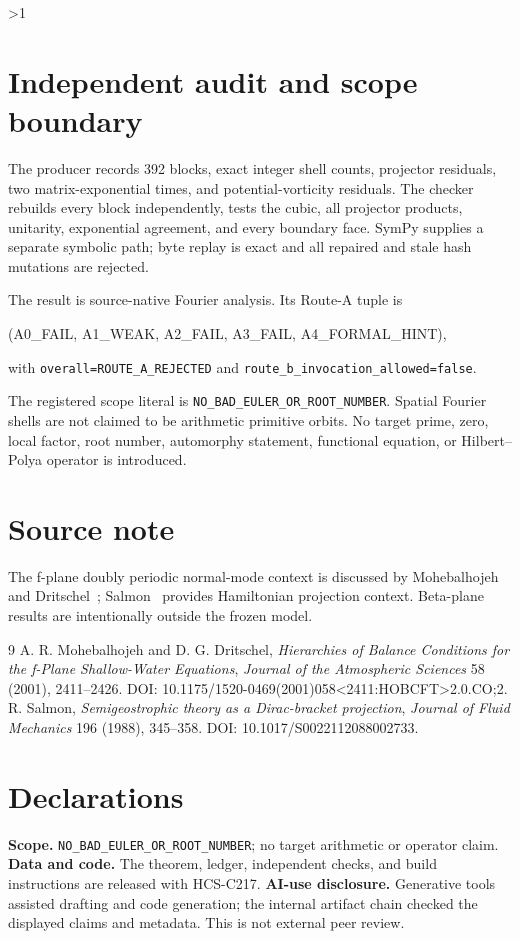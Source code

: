 \documentclass[11pt]{article}
\begin{document}
\ifnum\CRevisionRound>1
\section{Independent audit and scope boundary}
The producer records 392 blocks, exact integer shell counts, projector
residuals, two matrix-exponential times, and potential-vorticity residuals.
The checker rebuilds every block independently, tests the cubic, all projector
products, unitarity, exponential agreement, and every boundary face.
SymPy supplies a separate symbolic path; byte replay is exact and all repaired
and stale hash mutations are rejected.

The result is source-native Fourier analysis.  Its Route-A tuple is
\begin{center}\ttfamily
(A0\_FAIL, A1\_WEAK, A2\_FAIL, A3\_FAIL, A4\_FORMAL\_HINT),
\end{center}
with \texttt{overall=ROUTE\_A\_REJECTED} and
\texttt{route\_b\_invocation\_allowed=false}.

\small The registered scope literal is
\texttt{NO\_BAD\_EULER\_OR\_ROOT\_NUMBER}.  Spatial Fourier shells are not
claimed to be arithmetic primitive orbits.  No target prime, zero, local
factor, root number, automorphy statement, functional equation, or
Hilbert--Polya operator is introduced.
\fi

\section*{Source note}
The f-plane doubly periodic normal-mode context is discussed by
Mohebalhojeh and Dritschel~\cite{md2001}; Salmon~\cite{salmon1988} provides
Hamiltonian projection context.  Beta-plane results are intentionally outside
the frozen model.
\begin{thebibliography}{9}
 A. R. Mohebalhojeh and D. G. Dritschel,
\textit{Hierarchies of Balance Conditions for the f-Plane Shallow-Water Equations},
\emph{Journal of the Atmospheric Sciences} 58 (2001), 2411--2426.
DOI: 10.1175/1520-0469(2001)058<2411:HOBCFT>2.0.CO;2.
 R. Salmon, \textit{Semigeostrophic theory as a
Dirac-bracket projection}, \emph{Journal of Fluid Mechanics} 196 (1988),
345--358. DOI: 10.1017/S0022112088002733.
\end{thebibliography}

\section*{Declarations}
\textbf{Scope.} \texttt{NO\_BAD\_EULER\_OR\_ROOT\_NUMBER}; no target arithmetic
or operator claim. \textbf{Data and code.} The theorem, ledger, independent
checks, and build instructions are released with HCS-C217.
\textbf{AI-use disclosure.} Generative tools assisted drafting and code
generation; the internal artifact chain checked the displayed claims and
metadata.  This is not external peer review.
\end{document}
